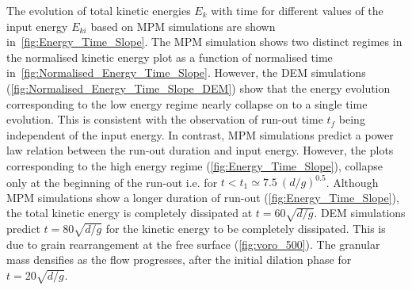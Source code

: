 \documentclass[3p,times,procedia,number]{elsarticle}
\begin{document}
The evolution of total kinetic energies $E_k$ with time for different values of 
the input energy $E_{ki}$ based on MPM simulations are shown 
in~\cref{fig:Energy_Time_Slope}. The MPM simulation shows two distinct regimes 
in the normalised kinetic energy plot as a function of normalised time 
in~\cref{fig:Normalised_Energy_Time_Slope}. However, the DEM simulations 
(\cref{fig:Normalised_Energy_Time_Slope_DEM}) show that the energy evolution 
corresponding to the low energy regime nearly collapse on to a single time 
evolution. This is consistent with the observation of run-out time $t_f$ being 
independent of the input energy. In contrast, MPM simulations predict a power 
law relation between the run-out duration and input energy. However, the 
plots corresponding to the high energy regime (\cref{fig:Energy_Time_Slope}), 
collapse only at the beginning of the run-out i.e. for $t < t_1 \simeq 7.5 \ 
(d/g)^{0.5}$. Although MPM simulations show a longer duration of run-out 
(\cref{fig:Energy_Time_Slope}), the total kinetic energy is completely 
dissipated at $t = 60 \sqrt{d/g}$. DEM simulations predict $t = 80 \sqrt{d/g}$ 
for the kinetic energy to be completely dissipated. This is due to grain 
rearrangement at the free surface (\cref{fig:voro_500}). The granular mass 
densifies as the flow progresses, after the initial dilation phase for $t = 
20\sqrt{d/g}$.
\end{document}
